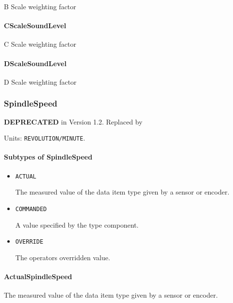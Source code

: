 B Scale weighting factor


\paragraph{CScaleSoundLevel}\mbox{}
\label{sec:CScaleSoundLevel}


C Scale weighting factor


\paragraph{DScaleSoundLevel}\mbox{}
\label{sec:DScaleSoundLevel}


D Scale weighting factor


\subsubsection{SpindleSpeed}
\label{sec:SpindleSpeed}



\textbf{DEPRECATED} in Version 1.2.  Replaced by 


Units: \texttt{REVOLUTION/MINUTE}.

\paragraph{Subtypes of SpindleSpeed}\mbox{}
\label{sec:Subtypes of SpindleSpeed}

\begin{itemize}

\item \texttt{ACTUAL}


The measured value of the data item type given by a sensor or encoder.

\item \texttt{COMMANDED}


A value specified by the  type component.

\item \texttt{OVERRIDE}


The operators overridden value.


\end{itemize}

\paragraph{ActualSpindleSpeed}\mbox{}
\label{sec:ActualSpindleSpeed}


The measured value of the data item type given by a sensor or encoder.


